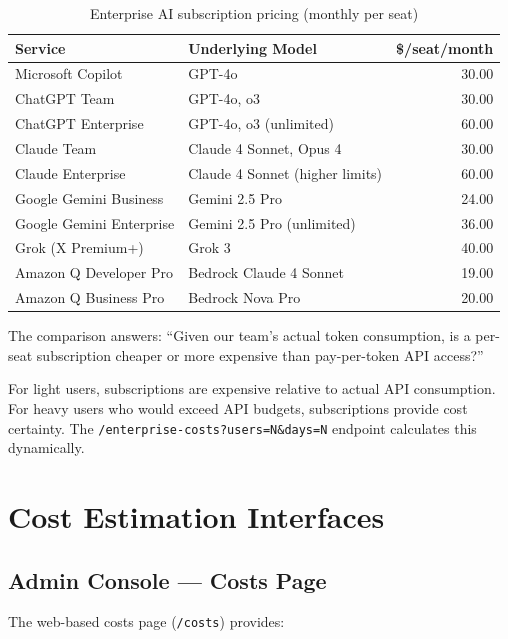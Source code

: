 \documentclass[11pt,a4paper]{article}
\begin{document}
\begin{table}[H]
\centering
\begin{tabular}{llr}
\toprule
\textbf{Service} & \textbf{Underlying Model} & \textbf{\$/seat/month} \\
\midrule
Microsoft Copilot & GPT-4o & 30.00 \\
ChatGPT Team & GPT-4o, o3 & 30.00 \\
ChatGPT Enterprise & GPT-4o, o3 (unlimited) & 60.00 \\
Claude Team & Claude 4 Sonnet, Opus 4 & 30.00 \\
Claude Enterprise & Claude 4 Sonnet (higher limits) & 60.00 \\
Google Gemini Business & Gemini 2.5 Pro & 24.00 \\
Google Gemini Enterprise & Gemini 2.5 Pro (unlimited) & 36.00 \\
Grok (X Premium+) & Grok 3 & 40.00 \\
Amazon Q Developer Pro & Bedrock Claude 4 Sonnet & 19.00 \\
Amazon Q Business Pro & Bedrock Nova Pro & 20.00 \\
\bottomrule
\end{tabular}
\caption{Enterprise AI subscription pricing (monthly per seat)}
\end{table}

The comparison answers: ``Given our team's actual token consumption, is a per-seat subscription cheaper or more expensive than pay-per-token API access?''

For light users, subscriptions are expensive relative to actual API consumption. For heavy users who would exceed API budgets, subscriptions provide cost certainty. The \texttt{/enterprise-costs?users=N\&days=N} endpoint calculates this dynamically.

\section{Cost Estimation Interfaces}

\subsection{Admin Console --- Costs Page}

The web-based costs page (\texttt{/costs}) provides:
\end{document}
